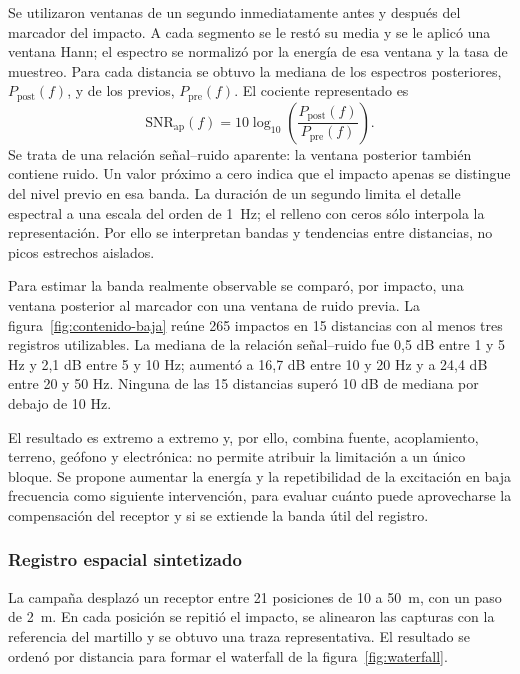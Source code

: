 Se utilizaron ventanas de un segundo inmediatamente antes y después del marcador del impacto. A cada segmento se le restó su media y se le aplicó una ventana Hann; el espectro se normalizó por la energía de esa ventana y la tasa de muestreo. Para cada distancia se obtuvo la mediana de los espectros posteriores, $P_{\mathrm{post}}(f)$, y de los previos, $P_{\mathrm{pre}}(f)$. El cociente representado es
\begin{equation}
\mathrm{SNR}_{\mathrm{ap}}(f)=10\log_{10}\!\left(\frac{P_{\mathrm{post}}(f)}{P_{\mathrm{pre}}(f)}\right).
\end{equation}
Se trata de una relación señal--ruido aparente: la ventana posterior también contiene ruido. Un valor próximo a cero indica que el impacto apenas se distingue del nivel previo en esa banda. La duración de un segundo limita el detalle espectral a una escala del orden de \SI{1}{Hz}; el relleno con ceros sólo interpola la representación. Por ello se interpretan bandas y tendencias entre distancias, no picos estrechos aislados.

Para estimar la banda realmente observable se comparó, por impacto, una ventana posterior al marcador con una ventana de ruido previa. La figura~\ref{fig:contenido-baja} reúne 265 impactos en 15 distancias con al menos tres registros utilizables. La mediana de la relación señal--ruido fue 0,5 dB entre 1 y 5 Hz y 2,1 dB entre 5 y 10 Hz; aumentó a 16,7 dB entre 10 y 20 Hz y a 24,4 dB entre 20 y 50 Hz. Ninguna de las 15 distancias superó 10 dB de mediana por debajo de 10 Hz.

El resultado es extremo a extremo y, por ello, combina fuente, acoplamiento, terreno, geófono y electrónica: no permite atribuir la limitación a un único bloque. Se propone aumentar la energía y la repetibilidad de la excitación en baja frecuencia como siguiente intervención, para evaluar cuánto puede aprovecharse la compensación del receptor y si se extiende la banda útil del registro.

\subsubsection{Registro espacial sintetizado}

La campaña desplazó un receptor entre 21 posiciones de 10 a \SI{50}{m}, con un paso de \SI{2}{m}. En cada posición se repitió el impacto, se alinearon las capturas con la referencia del martillo y se obtuvo una traza representativa. El resultado se ordenó por distancia para formar el waterfall de la figura~\ref{fig:waterfall}.

